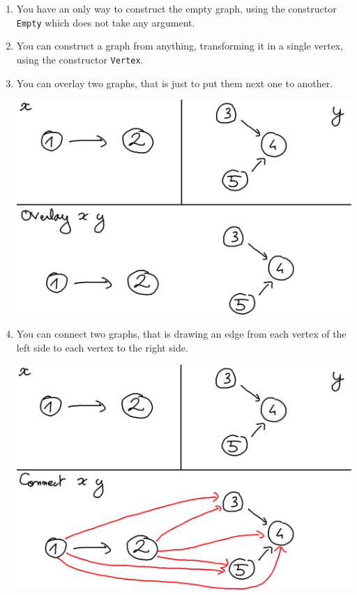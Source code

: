 \documentclass[10pt,a4paper]{article}
\begin{document}
\begin{enumerate}
\item You have an only way to construct the empty graph, using the constructor \verb|Empty| which does not take any argument.

\item You can construct a graph from anything, transforming it in a single vertex, using the constructor \verb|Vertex|.

\item You can overlay two graphs, that is just to put them next one to another.

\begin{center}
	\includegraphics[scale=0.4]{figspng/overlay.png}
\end{center}

\item You can connect two graphs, that is drawing an edge from each vertex of the left side to each vertex to the right side.

\begin{center}
	\includegraphics[scale=0.4]{figspng/connect.png}
\end{center}

\end{enumerate}
\end{document}
